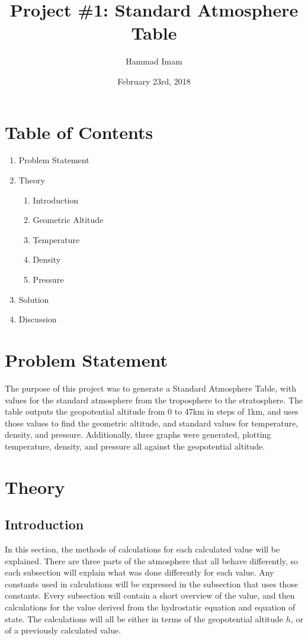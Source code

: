 \documentclass{article}
\title{Project \#1: Standard Atmosphere Table}
\author{Hammad Imam}
\date{February 23rd, 2018}
\begin{document}
\maketitle

\section*{Table of Contents}

\begin{enumerate}
    \item Problem Statement
    \item Theory
    \begin{enumerate}
        \item Introduction
        \item Geometric Altitude
        \item Temperature
        \item Density
        \item Pressure
    \end{enumerate}
    \item Solution
    \item Discussion
\end{enumerate}

\section{Problem Statement}
The purpose of this project was to generate a Standard Atmosphere Table, with values for the standard atmosphere from the troposphere to the stratosphere. The table outputs the geopotential altitude from 0 to 47km in steps of 1km, and uses those values to find the geometric altitude, and standard values for temperature, density, and pressure. Additionally, three graphs were generated, plotting temperature, density, and pressure all against the geopotential altitude. 

\section{Theory}
\subsection{Introduction}
In this section, the methods of calculations for each calculated value will be explained. There are three parts of the atmosphere that all behave differently, so each subsection will explain what was done differently for each value. Any constants used in calculations will be expressed in the subsection that uses those constants. Every subsection will contain a short overview of the value, and then calculations for the value derived from the hydrostatic equation and equation of state. The calculations will all be either in terms of the geopotential altitude $h$, or of a previously calculated value.
\end{document}
